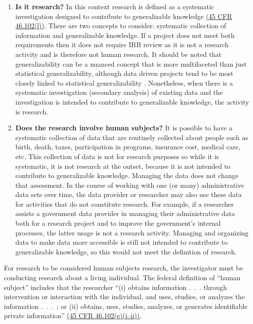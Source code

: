 \documentclass[
]{book}
\providecommand{\tightlist}{%
  \setlength{\itemsep}{0pt}\setlength{\parskip}{0pt}}
\begin{document}
\begin{enumerate}
\def\labelenumi{\arabic{enumi}.}
\tightlist
\item
  \textbf{Is it research?} In this context research is defined as a systematic investigation designed to contribute to generalizable knowledge \href{https://www.law.cornell.edu/cfr/text/45/46.102}{(45 CFR 46.102(l))}. There are two concepts to consider: systematic collection of information and generalizable knowledge. If a project does not meet both requirements then it does not require IRB review as it is not a research activity and is therefore not human research. It should be noted that generalizability can be a nuanced concept that is more multifaceted than just statistical generalizability, although data driven projects tend to be most closely linked to statistical generalizability \citep{lee2003}. Nonetheless, when there is a systematic investigation (secondary analysis) of existing data and the investigation is intended to contribute to generalizable knowledge, the activity is research.
\item
  \textbf{Does the research involve human subjects?} It is possible to have a systematic collection of data that are routinely collected about people such as birth, death, taxes, participation in programs, insurance cost, medical care, etc. This collection of data is not for research purposes so while it is systematic, it is not research at the outset, because it is not intended to contribute to generalizable knowledge. Managing the data does not change that assessment. In the course of working with one (or many) administrative data sets over time, the data provider or researcher may also use these data for activities that do not constitute research. For example, if a researcher assists a government data provider in managing their administrative data both for a research project and to improve the government's internal processes, the latter usage is not a research activity. Managing and organizing data to make data more accessible is still not intended to contribute to generalizable knowledge, so this would not meet the definition of research.
\end{enumerate}

For research to be considered human subjects research, the investigator must be conducting research about a living individual. The federal definition of ``human subject'' includes that the researcher ``(i) obtains information .~.~. through intervention or interaction with the individual, and uses, studies, or analyzes the information .~.~.~; or (ii) obtains, uses, studies, analyzes, or generates identifiable private information'' \href{https://www.law.cornell.edu/cfr/text/45/46.102}{(45 CFR 46.102(e)(i--ii))}.
\end{document}
